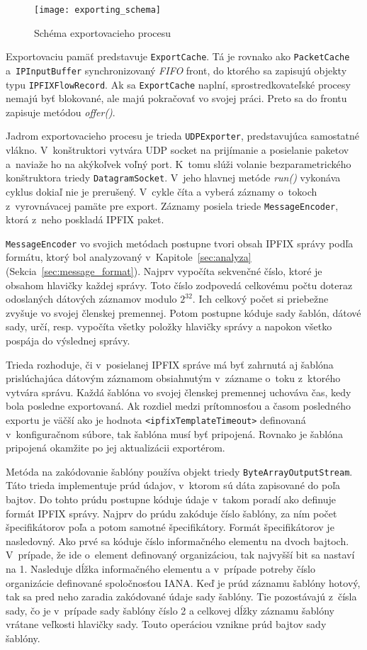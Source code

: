 \begin{figure}[ht!]
\centering
\texttt{[image: exporting\_schema]}
\caption{Schéma exportovacieho procesu}\label{o:exporting_schema}
\end{figure}

Exportovaciu pamäť predstavuje \verb|ExportCache|. Tá je rovnako ako \verb|PacketCache| 
a~\verb|IPInputBuffer| synchronizovaný \emph{FIFO} front, do ktorého sa zapisujú objekty typu 
\verb|IPFIXFlowRecord|. Ak sa \verb|ExportCache| naplní, sprostredkovateľské procesy nemajú byť blokované, 
ale majú pokračovať vo svojej práci. Preto sa do frontu zapisuje metódou \emph{offer()}.

Jadrom exportovacieho procesu je trieda \verb|UDPExporter|, predstavujúca samostatné vlákno.
V~konštruktori vytvára UDP socket na prijímanie a posielanie paketov a~naviaže ho na akýkoľvek voľný port.
K~tomu slúži volanie bezparametrického konštruktora triedy \verb|DatagramSocket|. V~jeho hlavnej metóde 
\emph{run()} vykonáva cyklus dokiaľ nie je prerušený. V~cykle číta a vyberá záznamy o~tokoch
z~vyrovnávacej pamäte pre export. Záznamy posiela triede \verb|MessageEncoder|, ktorá z~neho poskladá 
IPFIX paket.

\verb|MessageEncoder| vo svojich metódach postupne tvori obsah IPFIX správy podľa formátu, ktorý bol 
analyzovaný v~Kapitole~\ref{sec:analyza} (Sekcia~\ref{sec:message_format}). Najprv vypočíta 
sekvenčné číslo, ktoré je obsahom hlavičky každej správy. Toto číslo zodpovedá celkovému počtu doteraz 
odoslaných dátových záznamov modulo $2^{32}$. Ich celkový počet si priebežne zvyšuje vo svojej členskej 
premennej. Potom postupne kóduje sady šablón, dátové sady, určí, resp. vypočíta všetky položky 
hlavičky správy a napokon všetko pospája do výslednej správy.

Trieda rozhoduje, či v~posielanej IPFIX správe má byť zahrnutá aj šablóna prislúchajúca dátovým záznamom
obsiahnutým v~zázname o~toku z~ktorého vytvára správu. Každá šablóna vo svojej členskej premennej uchováva
čas, kedy bola posledne exportovaná. Ak rozdiel medzi prítomnosťou a časom posledného exportu je väčší ako 
je hodnota \verb|<ipfixTemplateTimeout>| definovaná v~konfiguračnom súbore, tak šablóna musí byť pripojená.
Rovnako je šablóna pripojená okamžite po jej aktualizácii exportérom. 

Metóda na zakódovanie šablóny používa objekt triedy \verb|ByteArrayOutputStream|. Táto trieda 
implementuje prúd údajov, v~ktorom sú dáta zapisované do poľa bajtov. Do tohto prúdu postupne kóduje údaje 
v~takom poradí ako definuje formát IPFIX správy. Najprv do prúdu zakóduje číslo šablóny, za ním 
počet špecifikátorov poľa a potom samotné špecifikátory. Formát špecifikátorov je nasledovný. Ako prvé sa 
kóduje číslo informačného elementu na dvoch bajtoch. V~prípade, že ide o~element definovaný 
organizáciou, tak najvyšší bit sa nastaví na 1. Nasleduje dĺžka informačného elementu a v~prípade potreby 
číslo organizácie definované spoločnosťou IANA. Keď je prúd záznamu šablóny hotový, tak sa pred neho 
zaradia zakódované údaje sady šablóny. Tie pozostávajú z~čísla sady, čo je v~prípade sady šablóny číslo 2
a celkovej dĺžky záznamu šablóny 
vrátane veľkosti hlavičky sady. Touto operáciou vznikne prúd bajtov sady šablóny.


